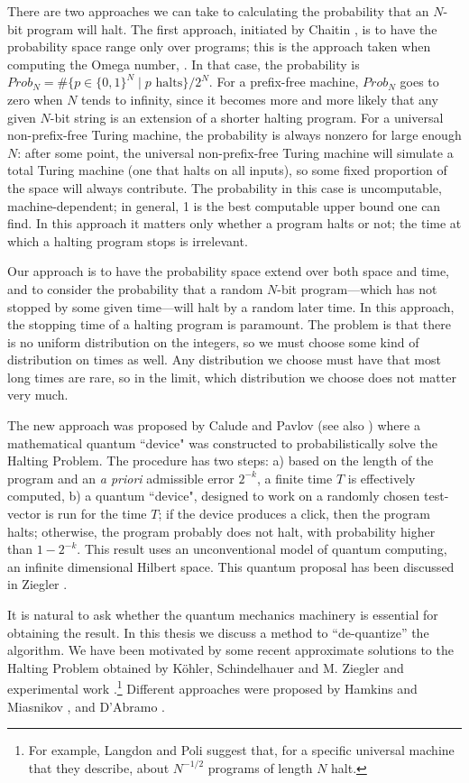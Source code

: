 \documentclass[12pt,twoside,openright]{report}
\begin{document}
There are two approaches we can take to calculating the probability that an $N$-bit program will halt.  The first approach, initiated by Chaitin \cite{Chaitin1975},  is to have the probability space range only over programs; this is the approach taken when computing the Omega number, \cite{CDS,Calude}.  In that case, the probability is $Prob_N = \#\{p \in \{0, 1\}^N \mid p  \mbox{ halts}\}/2^N.$  For a prefix-free machine, $Prob_N$ goes to zero when $N$ tends to infinity, since it becomes more and more likely that any given $N$-bit string is an extension of a shorter halting program.  For a universal non-prefix-free Turing machine, the probability is always nonzero for large enough $N$: after some point, the  universal non-prefix-free Turing machine will simulate a total Turing machine (one that halts on all inputs), so some fixed proportion of the space will always contribute.  The probability in this case is uncomputable, machine-dependent; in general, 1 is the best computable upper bound one can find. In this approach it matters only whether a program halts or not; the time at which a halting program stops is irrelevant.

Our approach is to have the probability space extend over both space and time, and to consider the probability that a random $N$-bit program---which has not stopped by some given time---will halt by a random later time.  In this approach, the stopping time of a halting program is paramount. The problem is that there is no uniform distribution on the integers, so we must choose some kind of distribution on times as well.  Any distribution we choose must have that most long times are rare, so in the limit, which distribution we choose does not matter very much.

The new approach was proposed by Calude and Pavlov \cite{CP} (see also \cite{ACP}) where a mathematical quantum ``device" was constructed to probabilistically solve the Halting Problem.  The procedure has two steps: a) based on the length of the program and an  {\it a priori} admissible error $2^{-k}$, a finite time $T$ is effectively computed, b) a quantum ``device", designed to work on a randomly chosen test-vector is run for the time $T$; if the device produces a click, then the program halts; otherwise, the program probably does not halt, with probability higher than $1-2^{-k}$. This result uses an unconventional model of quantum computing, an infinite dimensional Hilbert space.  This  quantum proposal has been discussed in  Ziegler \cite{Z}.

 It is natural to ask whether the quantum mechanics machinery is essential for obtaining the result.  In this thesis we discuss a method to ``de-quantize'' the algorithm.  We have been motivated by some recent approximate solutions to the Halting Problem obtained by K\"ohler,  Schindelhauer  and  M. Ziegler \cite{KSZ} and experimental work \cite{CDS,LP}.\footnote{For example, Langdon and Poli \cite{LP} suggest that, for a specific universal machine that they describe, about $N^{-1/2}$ programs of length $N$ halt.}
Different approaches were proposed by Hamkins and Miasnikov 
\cite{HM}, and D'Abramo \cite{D'A}.
\end{document}
